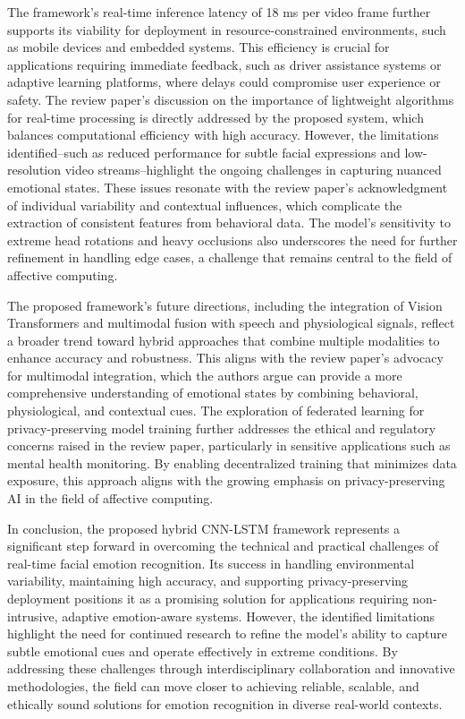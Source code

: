 \documentclass[conference]{IEEEtran}
\begin{document}
The framework's real-time inference latency of 18 ms per video frame further supports its viability for deployment in resource-constrained environments, such as mobile devices and embedded systems. This efficiency is crucial for applications requiring immediate feedback, such as driver assistance systems or adaptive learning platforms, where delays could compromise user experience or safety. The review paper's discussion on the importance of lightweight algorithms for real-time processing is directly addressed by the proposed system, which balances computational efficiency with high accuracy. However, the limitations identified--such as reduced performance for subtle facial expressions and low-resolution video streams--highlight the ongoing challenges in capturing nuanced emotional states. These issues resonate with the review paper's acknowledgment of individual variability and contextual influences, which complicate the extraction of consistent features from behavioral data. The model's sensitivity to extreme head rotations and heavy occlusions also underscores the need for further refinement in handling edge cases, a challenge that remains central to the field of affective computing.

The proposed framework's future directions, including the integration of Vision Transformers and multimodal fusion with speech and physiological signals, reflect a broader trend toward hybrid approaches that combine multiple modalities to enhance accuracy and robustness. This aligns with the review paper's advocacy for multimodal integration, which the authors argue can provide a more comprehensive understanding of emotional states by combining behavioral, physiological, and contextual cues. The exploration of federated learning for privacy-preserving model training further addresses the ethical and regulatory concerns raised in the review paper, particularly in sensitive applications such as mental health monitoring. By enabling decentralized training that minimizes data exposure, this approach aligns with the growing emphasis on privacy-preserving AI in the field of affective computing.

In conclusion, the proposed hybrid CNN-LSTM framework represents a significant step forward in overcoming the technical and practical challenges of real-time facial emotion recognition. Its success in handling environmental variability, maintaining high accuracy, and supporting privacy-preserving deployment positions it as a promising solution for applications requiring non-intrusive, adaptive emotion-aware systems. However, the identified limitations highlight the need for continued research to refine the model's ability to capture subtle emotional cues and operate effectively in extreme conditions. By addressing these challenges through interdisciplinary collaboration and innovative methodologies, the field can move closer to achieving reliable, scalable, and ethically sound solutions for emotion recognition in diverse real-world contexts.
\end{document}
